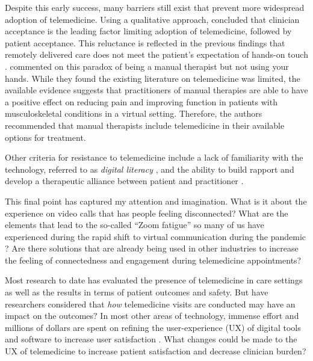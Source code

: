 \documentclass[utf8]{FrontiersinHarvard} %
\begin{document}
Despite this early success, many barriers still exist that prevent more widespread adoption of telemedicine. Using a qualitative approach, \citet{wadeClinicianAcceptanceKey2014} concluded that clinician acceptance is the leading factor limiting adoption of telemedicine, followed by patient acceptance. This reluctance is reflected in the previous findings that remotely delivered care does not meet the patient's expectation of hands-on touch \citep{baroniStateArtTelerehabilitation2023}. \citet{saragiottoCanYouBe2022} commented on this paradox of being a manual therapist but not using your hands. While they found the existing literature on telemedicine was limited, the available evidence suggests that practitioners of manual therapies are able to have a positive effect on reducing pain and improving function in patients with musculoskeletal conditions in a virtual setting. Therefore, the authors recommended that manual therapists include telemedicine in their available options for treatment.

Other criteria for resistance to telemedicine include a lack of familiarity with the technology, referred to as \textit{digital literacy} \citep{fernandesWhatExtentCan2021, Manganello2017Relationship}, and the ability to build rapport and develop a therapeutic alliance between patient and practitioner \citep{wallaceGroupIndividualTelehealth2022}.

This final point has captured my attention and imagination. What is it about the experience on video calls that has people feeling disconnected? What are the elements that lead to the so-called ``Zoom fatigue'' so many of us have experienced during the rapid shift to virtual communication during the pandemic \citep{bailensonNonverbalOverloadTheoretical2021}? Are there solutions that are already being used in other industries to increase the feeling of connectedness and engagement during telemedicine appointments?

Most research to date has evaluated the presence of telemedicine in care settings as well as the results in terms of patient outcomes and safety. But have researchers considered that \textit{how} telemedicine visits are conducted may have an impact on the outcomes? In most other areas of technology, immense effort and millions of dollars are spent on refining the user-experience (UX) of digital tools and software to increase user satisfaction \citep{monachelliDesigningMHealthApps2024}. What changes could be made to the UX of telemedicine to increase patient satisfaction and decrease clinician burden?
\end{document}

